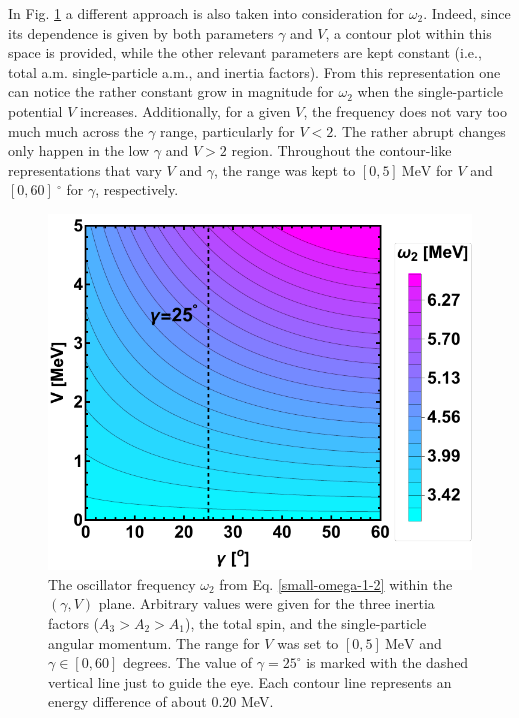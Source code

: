 In Fig. \ref{fig-omega2-V-Gamma} a different approach is also taken into consideration for $\omega_2$. Indeed, since its dependence is given by both parameters $\gamma$ and $V$, a contour plot within this space is provided, while the other relevant parameters are kept constant (i.e., total a.m. single-particle a.m., and inertia factors). From this representation one can notice the rather constant grow in magnitude for $\omega_2$ when the single-particle potential $V$ increases. Additionally, for a given $V$, the frequency does not vary too much much across the $\gamma$ range, particularly for $V<2$. The rather abrupt changes only happen in the low $\gamma$ and $V>2$ region. Throughout the contour-like representations that vary $V$ and $\gamma$, the range was kept to $[0,5]\ \text{MeV}$ for $V$ and $[0,60]\  ^\circ$ for $\gamma$, respectively.
\begin{figure}
    \centering
    \includegraphics[scale=0.8]{Chapters/Figures/omega-2-gamma-V.pdf}
    \caption{The oscillator frequency $\omega_2$ from Eq. \ref{small-omega-1-2} within the $(\gamma,V)$ plane. Arbitrary values were given for the three inertia factors ($A_3>A_2>A_1$), the total spin, and the single-particle angular momentum. The range for $V$ was set to $[0,5]\ \text{MeV}$ and $\gamma\in[0,60]$ degrees. The value of $\gamma=25^\circ$ is marked with the dashed vertical line just to guide the eye. Each contour line represents an energy difference of about $0.20$ MeV.}
    \label{fig-omega2-V-Gamma}
\end{figure}

